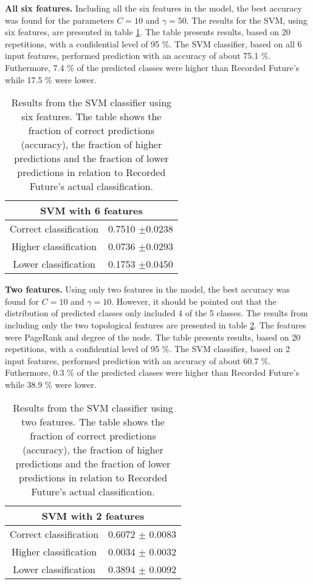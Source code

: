\textbf{All six features.} Including all the six features in the model, the best accuracy was found for the parameters $C=10$ and $\gamma=50$. The results for the SVM, using six features, are presented in table \ref{IpRes}. The table presents results, based on 20 repetitions, with a confidential level of 95 \%. The SVM classifier, based on all 6 input features, performed prediction with an accuracy of about 75.1 \%. Futhermore, 7.4 \% of the predicted classes were higher than Recorded Future's while 17.5 \% were lower. 

\begin{table}[h!]
    \centering
    \caption{Results from the SVM classifier using six features. The table shows the fraction of correct predictions (accuracy), the fraction of higher predictions and the fraction of lower predictions in relation to Recorded Future's actual classification.}
    \begin{tabular}{|c|c|}
    \hline
        \multicolumn{2}{|c|}{SVM with 6 features}\\ \hline
        Correct classification  & 0.7510 $\pm$0.0238 \\
        Higher classification   & 0.0736 $\pm$0.0293 \\
        Lower classification    & 0.1753 $\pm$0.0450 \\ \hline
    \end{tabular}
    \label{IpRes}
\end{table}



\textbf{Two features.} Using only two features in the model, the best accuracy was found for $C=10$ and $\gamma=10$. However, it should be pointed out that the distribution of predicted classes only included 4 of the 5 classes. The results from including only the two topological features are presented in table \ref{IpRes2Feat}. The features were PageRank and degree of the node. The table presents results, based on 20 repetitions, with a confidential level of 95 \%. The SVM classifier, based on 2 input features, performed prediction with an accuracy of about 60.7 \%. Futhermore, 0.3 \% of the predicted classes were higher than Recorded Future's while 38.9 \% were lower. 

\begin{table}[h!]
    \centering
    \caption{Results from the SVM classifier using two features. The table shows the fraction of correct predictions (accuracy), the fraction of higher predictions and the fraction of lower predictions in relation to Recorded Future's actual classification.}
    \begin{tabular}{|c|c|}
    \hline
        \multicolumn{2}{|c|}{SVM with 2 features}\\ \hline
        Correct classification  & 0.6072 $\pm$ 0.0083 \\
        Higher classification   & 0.0034 $\pm$ 0.0032 \\
        Lower classification    & 0.3894 $\pm$ 0.0092 \\ \hline
    \end{tabular}
    \label{IpRes2Feat}
\end{table}

